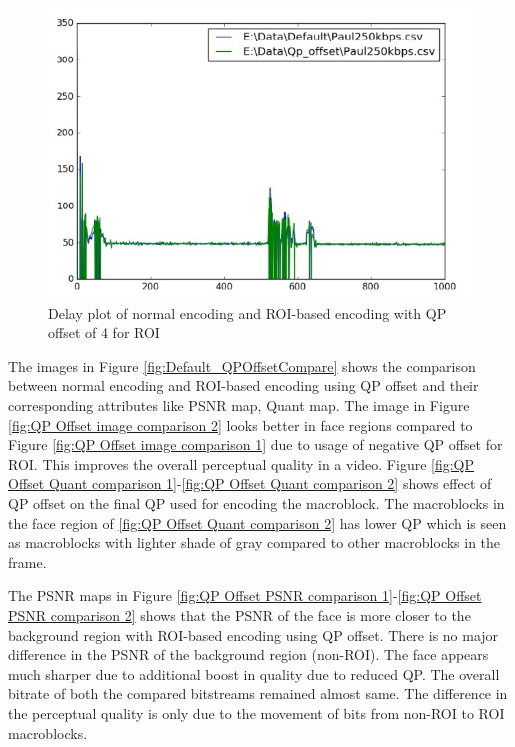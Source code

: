 \documentclass[11pt]{article} %
\begin{document}
\begin{figure}[!h]
    \centering
    \includegraphics[scale=0.75]{QPOffset/Paul250kbps_QP_Offset_Delay}
    \caption{Delay plot of normal encoding and ROI-based encoding with QP offset of 4 for ROI}
    \label{fig:DelayDefault_QPOffsetCompare}
\end{figure}

The images in Figure \ref{fig:Default_QPOffsetCompare} shows the comparison between normal encoding and ROI-based encoding using QP offset and their corresponding attributes like PSNR map, Quant map. The image in Figure \ref{fig:QP Offset image comparison 2} looks better in face regions compared to Figure \ref{fig:QP Offset image comparison 1} due to usage of negative QP offset for ROI. This improves the overall perceptual quality in a video. Figure \ref{fig:QP Offset Quant comparison 1}-\ref{fig:QP Offset Quant comparison 2} shows effect of QP offset on the final QP used for encoding the macroblock. The macroblocks in the face region of \ref{fig:QP Offset Quant comparison 2} has lower QP which is seen as  macroblocks with lighter shade of gray compared to other macroblocks in the frame. 

 The PSNR maps in Figure \ref{fig:QP Offset PSNR comparison 1}-\ref{fig:QP Offset PSNR comparison 2} shows that the PSNR of the face is more closer to the background region with ROI-based encoding using QP offset. There is no major difference in the PSNR of the background region (non-ROI). The face appears much sharper due to additional boost in quality due to reduced QP. The overall bitrate of both the compared bitstreams remained almost same. The difference in the perceptual quality is only due to the movement of bits from non-ROI to ROI macroblocks. 
 
\end{document}
